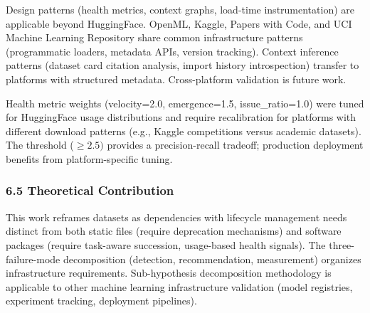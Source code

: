 Design patterns (health metrics, context graphs, load-time instrumentation) are applicable beyond HuggingFace. OpenML, Kaggle, Papers with Code, and UCI Machine Learning Repository share common infrastructure patterns (programmatic loaders, metadata APIs, version tracking). Context inference patterns (dataset card citation analysis, import history introspection) transfer to platforms with structured metadata. Cross-platform validation is future work.

Health metric weights (velocity=2.0, emergence=1.5, issue\_ratio=1.0) were tuned for HuggingFace usage distributions and require recalibration for platforms with different download patterns (e.g., Kaggle competitions versus academic datasets). The threshold ($\geq 2.5)$ provides a precision-recall tradeoff; production deployment benefits from platform-specific tuning.

\subsubsection{6.5 Theoretical Contribution}

This work reframes datasets as dependencies with lifecycle management needs distinct from both static files (require deprecation mechanisms) and software packages (require task-aware succession, usage-based health signals). The three-failure-mode decomposition (detection, recommendation, measurement) organizes infrastructure requirements. Sub-hypothesis decomposition methodology is applicable to other machine learning infrastructure validation (model registries, experiment tracking, deployment pipelines).
